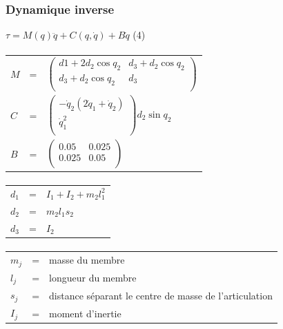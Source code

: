 \documentclass[pdftex,a4paper,11pt]{article}
\begin{document}
\subsubsection{Dynamique inverse}
$\tau = M(q)\ddot{q} + C(q, \dot{q}) + B\dot{q} $ (4)

\paragraph{}
\begin{tabular}{lcl}
    $M$ & = &
    $
    \begin{pmatrix}
        d1 + 2 d_2 \cos q_2  & d_3 + d_2 \cos q_2 \\
        d_3 + d_2 \cos q_2 & d_3 \\
    \end{pmatrix}
    $ \\

    $C$ & = &
    $
    \begin{pmatrix}
        -\dot{q}_2 (2 \dot{q}_1 + \dot{q}_2) \\
        \dot{q}_1^2 \\
    \end{pmatrix}
    d_2 \sin q_2
    $\\

    $B$ & = &
    $
    \begin{pmatrix}
        0.05  & 0.025 \\
        0.025 & 0.05 \\
    \end{pmatrix}
    $
\end{tabular}

\paragraph{}
\begin{tabular}{lcl}
    $d_1$ & = & $I_1 + I_2 + m_2 l_1^2$ \\
    $d_2$ & = & $m_2 l_1 s_2$ \\
    $d_3$ & = & $I_2$ \\
\end{tabular}

\paragraph{}
\begin{tabular}{lcl}
    $m_j$ & = & masse du membre \\
    $l_j$ & = & longueur du membre \\
    $s_{j}$ & = & distance séparant le centre de masse de l'articulation \\
    $I_{j}$ & = & moment d'inertie \\
\end{tabular}
\end{document}
